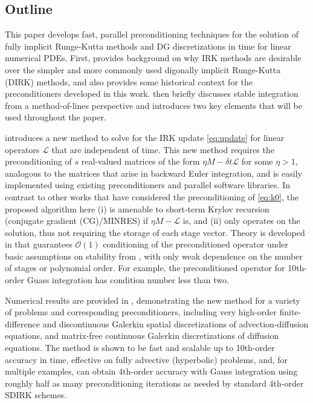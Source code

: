 \documentclass[a4paper,10pt]{article}
\begin{document}
\subsection{Outline}\label{sec:intro:outline}

This paper develops fast, parallel preconditioning techniques for the solution of fully implicit
Runge-Kutta methods and DG discretizations in time for linear numerical PDEs. First,
 provides background on why IRK methods are desirable over the simpler and more
commonly used digonally implicit Runge-Kutta (DIRK) methods, and also provides some historical
context for the preconditioners developed in this work.  then briefly discusses
stable integration from a method-of-lines perspective and introduces two key elements that will be
used throughout the paper.

 introduces a new method to solve for the IRK update
\eqref{eq:update} for linear operators $\mathcal{L}$ that are independent of time.
This new method requires the preconditioning of $s$ real-valued matrices of the form
$\eta M - \delta t\mathcal{L}$ for some $\eta > 1$, analogous to the matrices that
arise in backward Euler integration, and is easily implemented
using existing preconditioners and parallel software libraries.
In contrast to other works that have considered the preconditioning of \eqref{eq:k0},
the proposed algorithm here (i) is amenable to short-term Krylov recursion (conjugate
gradient (CG)/MINRES) if $\eta M - \mathcal{L}$ is, and (ii) only operates on the solution,
thus not requiring the storage of each stage vector. Theory is developed in
 that guarantees $\mathcal{O}(1)$ conditioning of the
preconditioned operator under basic assumptions on stability from
, with only weak dependence on the number of
stages or polynomial order. For example, the preconditioned operator for
10th-order Guass integration has condition number less than two.

Numerical results are provided in , demonstrating the new
method for a variety of problems and corresponding preconditioners, including
very high-order finite-difference and discontinuous Galerkin spatial discretizations of
advection-diffusion equations, and matrix-free continuous Galerkin
discretizations of diffusion equations. The method is shown to be fast and scalable
up to 10th-order accuracy in time, effective on fully advective (hyperbolic)
problems, and, for multiple examples, can obtain 4th-order accuracy with Gauss
integration using roughly half as many preconditioning iterations
as needed by standard 4th-order SDIRK schemes.
\end{document}
